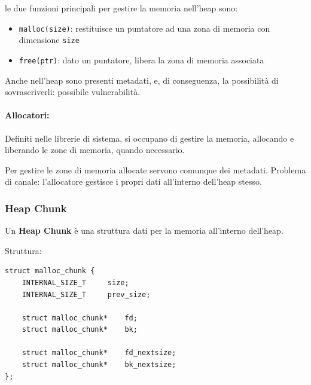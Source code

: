 le due funzioni principali per gestire la memoria nell'heap sono: 
\begin{itemize}
	\item \texttt{malloc(size)}: restituisce un puntatore ad una zona di memoria con dimensione \texttt{size}
	
    \item \texttt{free(ptr)}: dato un puntatore, libera la zona di memoria associata
\end{itemize}

Anche nell'heap sono presenti metadati, e, di conseguenza, la possibilità di sovrascriverli: possibile vulnerabilità.

\paragraph{Allocatori:} Definiti nelle librerie di sistema, si occupano di gestire la memoria, allocando e liberando le zone di memoria, quando necessario.

Per gestire le zone di memoria allocate servono comunque dei metadati. Problema di canale: l'allocatore gestisce i propri dati all'interno dell'heap stesso.

\subsubsection{Heap Chunk} 

Un \textbf{Heap Chunk} è una struttura dati per la memoria all'interno dell'heap.

Struttura:
\begin{verbatim}
struct malloc_chunk {
    INTERNAL_SIZE_T     size; 
    INTERNAL_SIZE_T     prev_size; 

    struct malloc_chunk*    fd;
    struct malloc_chunk*    bk;

    struct malloc_chunk*    fd_nextsize;
    struct malloc_chunk*    bk_nextsize;
};
\end{verbatim}

